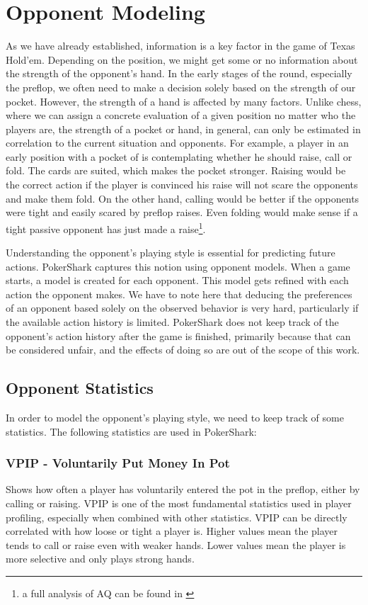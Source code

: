\section{Opponent Modeling}
\label{sec:opponentModeling}

As we have already established, information is a key factor in the game of Texas Hold'em. Depending on the position, we might get some or no information about the strength of the opponent's hand. In the early stages of the round, especially the preflop, we often need to make a decision solely based on the strength of our pocket. However, the strength of a hand is affected by many factors. Unlike chess, where we can assign a concrete evaluation of a given position no matter who the players are, the strength of a pocket or hand, in general, can only be estimated in correlation to the current situation and opponents. For example, a player in an early position with a pocket of  is contemplating whether he should raise, call or fold. The cards are suited, which makes the pocket stronger. Raising would be the correct action if the player is convinced his raise will not scare the opponents and make them fold. On the other hand, calling would be better if the opponents were tight and easily scared by preflop raises. Even folding would make sense if a tight passive opponent has just made a raise\footnote{a full analysis of AQ can be found in \cite{sklansky_2003}}.

Understanding the opponent's playing style is essential for predicting future actions. PokerShark captures this notion using opponent models. When a game starts, a model is created for each opponent. This model gets refined with each action the opponent makes. We have to note here that deducing the preferences of an opponent based solely on the observed behavior is very hard, particularly if the available action history is limited. PokerShark does not keep track of the opponent's action history after the game is finished, primarily because that can be considered unfair, and the effects of doing so are out of the scope of this work.

\subsection{Opponent Statistics}
In order to model the opponent's playing style, we need to keep track of some statistics. The following statistics are used in PokerShark:

\subsubsection{VPIP - Voluntarily Put Money In Pot}
Shows how often a player has voluntarily entered the pot in the preflop, either by calling or raising. VPIP is one of the most fundamental statistics used in player profiling, especially when combined with other statistics.
VPIP can be directly correlated with how loose or tight a player is. Higher values mean the player tends to call or raise even with weaker hands. Lower values mean the player is more selective and only plays strong hands.

